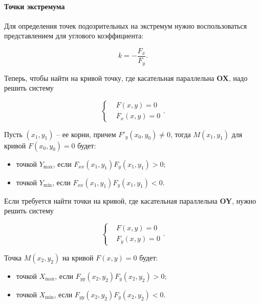 			\paragraph{Точки экстремума}

				Для определения точек подозрительных на экстремум нужно  воспользоваться представлением для углового коэффициента:

				\begin{equation}
					k = - \frac{F_{x}}{F_{y}}.
				\end{equation}

				Теперь, чтобы найти на кривой точку, где касательная параллельна \textbf{OX}, надо решить систему

				\begin{equation}
					\begin{cases}
						& F \left( x, y \right) = 0\\
						& F_{x} \left( x, y \right) = 0
					\end{cases}.
				\end{equation}

				Пусть $\left( x_{1}, y_{1} \right)$ -- ее корни, причем $F'_{y} \left( x_{0}, y_{0} \right) \neq 0$, тогда $M \left( x_{1}, y_{1} \right)$ для кривой $F \left( x_{0}, y_{0} \right) = 0$ будет:

				\begin{itemize}
					\item точкой $Y_{\max}$, если $F_{xx} \left( x_{1}, y_{1} \right) F_{y} \left( x_{1}, y_{1} \right) > 0$;

					\item точкой $Y_{\min}$, если $F_{xx} \left( x_{1}, y_{1} \right) F_{y} \left( x_{1}, y_{1} \right) < 0$.
				\end{itemize}

				Если требуется найти точки на кривой, где касательная параллельна \textbf{OY}, нужно решить систему

				\begin{equation}
					\begin{cases}
						& F \left( x, y \right) = 0\\
						& F_{y} \left( x, y \right) = 0
					\end{cases}.
				\end{equation}

				Точка $M \left( x_{2}, y_{2} \right)$ на кривой $F \left( x, y \right) = 0$ будет:

				\begin{itemize}
					\item точкой $X_{\max}$, если $F_{yy} \left( x_{2}, y_{2} \right) F_{y} \left( x_{2}, y_{2} \right) > 0$;
					
					\item точкой $X_{\min}$, если $F_{yy} \left( x_{2}, y_{2} \right) F_{y} \left( x_{2}, y_{2} \right) < 0$.
				\end{itemize} 

